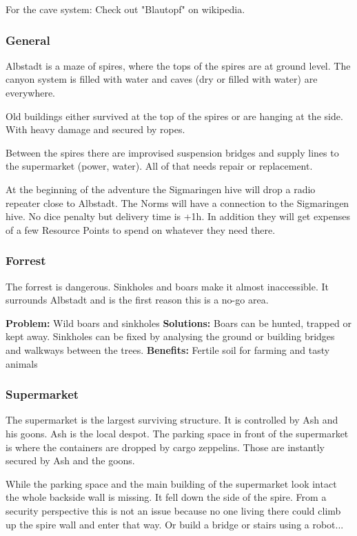 For the cave system: Check out "Blautopf" on wikipedia. 

\subsubsection{General}

Albstadt is a maze of spires, where the tops of the spires are at ground level. The canyon system is filled with water and caves (dry or filled with water) are everywhere.

Old buildings either survived at the top of the spires or are hanging at the side. With heavy damage and secured by ropes.

Between the spires there are improvised suspension bridges and supply lines to the supermarket (power, water). All of that needs repair or replacement.

At the beginning of the adventure the Sigmaringen hive will drop a radio repeater close to Albstadt. The Norms will have a connection to the Sigmaringen hive. No dice penalty but delivery time is +1h.
In addition they will get expenses of a few Resource Points to spend on whatever they need there.

\subsubsection{Forrest}

The forrest is dangerous. Sinkholes and boars make it almost inaccessible. It surrounds Albstadt and is the first reason this is a no-go area.

\textbf{Problem:} Wild boars and sinkholes
\textbf{Solutions:} Boars can be hunted, trapped or kept away. Sinkholes can be fixed by analysing the ground or building bridges and walkways between the trees. 
\textbf{Benefits:} Fertile soil for farming and tasty animals

\subsubsection{Supermarket}

The supermarket is the largest surviving structure. It is controlled by Ash and his goons. Ash is the local despot. The parking space in front of the supermarket is where the containers are dropped by cargo zeppelins. Those are instantly secured by Ash and the goons.

While the parking space and the main building of the supermarket look intact the whole backside wall is missing. It fell down the side of the spire. From a security perspective this is not an issue because no one living there could climb up the spire wall and enter that way. Or build a bridge or stairs using a robot...

